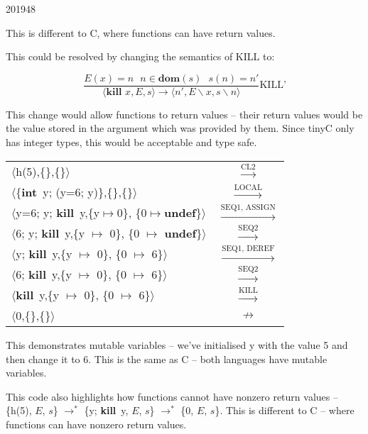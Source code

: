 \documentclass[10pt,\jkfside,a4paper]{article}
\begin{document}
\begin{examquestion}{2019}{4}{8}
\begin{enumerate}
\begin{enumerate}[label=(\roman*)]
This is different to C, where functions can have return values.

This could be resolved by changing the semantics of KILL to:

\[
\dfrac{E(x)=n \ \ \ n \in \textbf{dom}(s) \ \ \ s(n)=n'}
{\langle \textbf{kill }x, E, s \rangle \to \langle n', E \backslash x,
s \backslash n \rangle}\text{KILL'}
\]

This change would allow functions to return values -- their return values
would be the value stored in the argument which was provided by them. Since
tinyC only has integer types, this would be acceptable and type safe.

\begin{table}[H]
\centering
\begin{tabular}{l c}
$\langle$h(5),\{\},\{\}$\rangle$ & $\stackrel{\text{CL2}}{\to}$ \\
$\langle$\{\textbf{int}~y; (y=6; y)\},\{\},\{\}$\rangle$ &
$\stackrel{\text{LOCAL}}{\to}$ \\
$\langle$y=6; y; \textbf{kill}~y,\{y$\mapsto$0\},
\{0$\mapsto$\textbf{undef}\}$\rangle$ &
$\stackrel{\text{SEQ1, ASSIGN}}{\to}$ \\
$\langle$6; y; \textbf{kill}~y,\{y $\mapsto$ 0\},
\{0 $\mapsto$ \textbf{undef}\}$\rangle$ &
$\stackrel{\text{SEQ2}}{\to}$ \\
$\langle$y; \textbf{kill}~y,\{y $\mapsto$ 0\},
\{0 $\mapsto$ 6\}$\rangle$ &
$\stackrel{\text{SEQ1, DEREF}}{\to}$ \\
$\langle$6; \textbf{kill}~y,\{y $\mapsto$ 0\},
\{0 $\mapsto$ 6\}$\rangle$ &
$\stackrel{\text{SEQ2}}{\to}$ \\
$\langle$\textbf{kill}~y,\{y $\mapsto$ 0\},
\{0 $\mapsto$ 6\}$\rangle$ &
$\stackrel{\text{KILL}}{\to}$ \\
$\langle$0,\{\},\{\}$\rangle$ &
$\not\to$ \\
\end{tabular}
\end{table}

\iffalse

This demonstrates mutable variables -- we've initialised y with the value 5
and then change it to 6. This is the same as C -- both languages have
mutable variables.

This code also highlights how functions cannot have nonzero return values --
\{h(5), $E$, $s$\} $\to^*$ \{y; \textbf{kill}~y, $E$, $s$\}
$\to^*$ \{0, $E$, $s$\}. This is different to C -- where
functions can have nonzero return values.


\end{enumerate}
\end{enumerate}
\end{examquestion}
\end{document}
